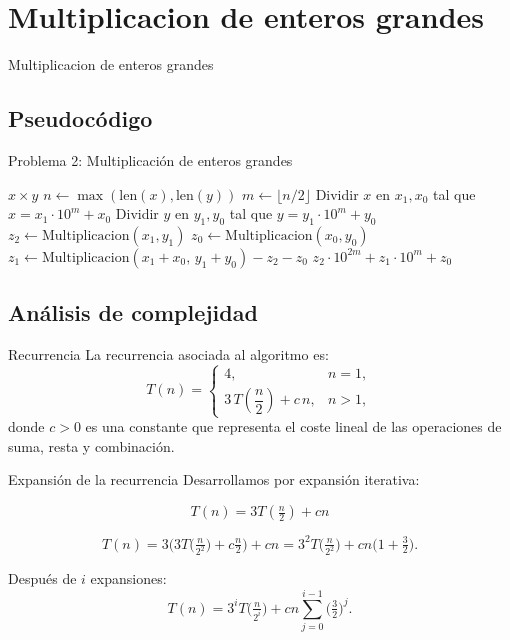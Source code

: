 \documentclass{beamer}
\begin{document}

\section{Multiplicacion de enteros grandes}
\begin{frame}{Multiplicacion de enteros grandes}
        \tableofcontents[sections={3}]
\end{frame}
\subsection{Pseudocódigo}
\begin{frame}{Problema 2: Multiplicación de enteros grandes}
\begin{algorithm}[H]
\caption{Multiplicación de enteros grandes por divide y vencerás}
\begin{algorithmic}[1]
     \State \Return $x \times y$ 
  \EndIf
  \State $n \gets \max(\text{len}(x), \text{len}(y))$
  \State $m \gets \lfloor n/2 \rfloor$
  \State Dividir $x$ en $x_1, x_0$ tal que $x = x_1 \cdot 10^m + x_0$
  \State Dividir $y$ en $y_1, y_0$ tal que $y = y_1 \cdot 10^m + y_0$
  \State $z_2 \gets \text{Multiplicacion}(x_1, y_1)$
  \State $z_0 \gets \text{Multiplicacion}(x_0, y_0)$
  \State $z_1 \gets \text{Multiplicacion}(x_1+x_0,\, y_1+y_0) - z_2 - z_0$
  \State \Return $z_2 \cdot 10^{2m} + z_1 \cdot 10^m + z_0$
  \EndFunction 
\end{algorithmic}
\end{algorithm}
\end{frame}



\subsection{Análisis de complejidad}
\begin{frame}{Recurrencia}
La recurrencia asociada al algoritmo  es:
\[
T(n) =
\begin{cases}
4, & n=1, \\[6pt]
3\,T\!\left(\dfrac{n}{2}\right) + c\,n, & n>1,
\end{cases}
\]
donde $c>0$ es una constante que representa el coste lineal de las operaciones de suma, resta y combinación.
\end{frame}

\begin{frame}{Expansión de la recurrencia}
Desarrollamos por expansión iterativa:

\[
T(n) = 3T\!\left(\tfrac{n}{2}\right)+c n
\]

\[
T(n) = 3\Big(3T\!\big(\tfrac{n}{2^2}\big)+c\tfrac{n}{2}\Big)+c n
= 3^2 T\!\big(\tfrac{n}{2^2}\big) + c n\Big(1+\tfrac{3}{2}\Big).
\]

Después de $i$ expansiones:
\[
T(n)=3^{i}T\!\big(\tfrac{n}{2^{i}}\big) + c n\sum_{j=0}^{i-1}\Big(\tfrac{3}{2}\Big)^{j}.
\]
\end{frame}
\end{document}
